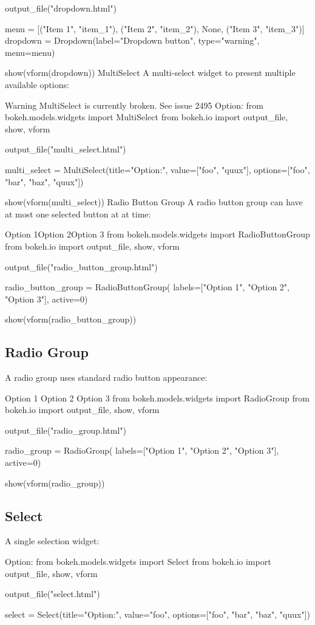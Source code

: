 output_file("dropdown.html")

menu = [("Item 1", "item_1"), ("Item 2", "item_2"), None, ("Item 3", "item_3")]
dropdown = Dropdown(label="Dropdown button", type="warning", menu=menu)

show(vform(dropdown))
MultiSelect
A multi-select widget to present multiple available options:

Warning
MultiSelect is currently broken. See issue 2495
Option: 
from bokeh.models.widgets import MultiSelect
from bokeh.io import output_file, show, vform

output_file("multi_select.html")

multi_select = MultiSelect(title="Option:", value=["foo", "quux"],
                           options=["foo", "bar", "baz", "quux"])

show(vform(multi_select))
Radio Button Group
A radio button group can have at most one selected button at at time:

Option 1Option 2Option 3
from bokeh.models.widgets import RadioButtonGroup
from bokeh.io import output_file, show, vform

output_file("radio_button_group.html")

radio_button_group = RadioButtonGroup(
        labels=["Option 1", "Option 2", "Option 3"], active=0)

show(vform(radio_button_group))
\subsection{Radio Group}
A radio group uses standard radio button appearance:

Option 1
Option 2
Option 3
from bokeh.models.widgets import RadioGroup
from bokeh.io import output_file, show, vform

output_file("radio_group.html")

radio_group = RadioGroup(
        labels=["Option 1", "Option 2", "Option 3"], active=0)

show(vform(radio_group))
\subsection{Select}
A single selection widget:

Option: 
from bokeh.models.widgets import Select
from bokeh.io import output_file, show, vform

output_file("select.html")

select = Select(title="Option:", value="foo", options=["foo", "bar", "baz", "quux"])

